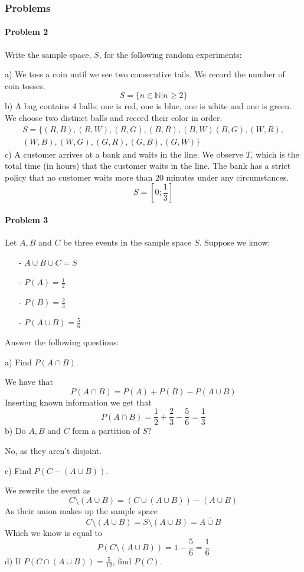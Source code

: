 \subsubsection{Problems}
\paragraph{Problem 2}
Write the sample space, $S$, for the following random experiments:

a) We toss a coin until we see two consecutive tails. We record the number of coin tosses.
\[
    S= \{n\in \mathbb{N}|n\geq 2\}
\]
b) A bag contains 4 balls: one is red, one is blue, one is white and one is green. We choose two distinct balls and record their color in order.
\begin{equation*}
    \begin{gathered}
        S=\{(R,B),(R,W),(R,G),(B,R),(B,W)(B,G),(W,R), \\
        (W,B),(W,G),(G,R),(G,B),(G,W)\}
    \end{gathered}
\end{equation*}
c) A customer arrives at a bank and waits in the line. We observe $T$, which is the total time (in hours) that the customer waits in the line. The bank has a strict policy that no customer waits more than 20 minutes under any circumstances.
\[
S=\left[0;\frac{1}{3}\right]
\]
\paragraph{Problem 3}
Let $A,B$ and $C$ be three events in the sample space $S$. Suppose we know:
\begin{itemize}
    \item[-] $A\cup B \cup C=S$
    \item[-] $P(A)=\frac{1}{2}$
    \item[-] $P(B)=\frac{2}{3}$
    \item[-] $P(A\cup B)=\frac{5}{6}$
\end{itemize}
Answer the following questions:

a) Find $P(A\cap B)$.

We have that
\[
    P(A\cap B)=P(A)+P(B)-P(A\cup B)
\]
Inserting known information we get that
\[
    P(A\cap B)=\frac{1}{2}+\frac{2}{3}-\frac{5}{6}=\frac{1}{3}
\]
b) Do $A,B$ and $C$ form a partition of $S$?

No, as they aren't disjoint.

c) Find $P(C-(A\cup B))$.

We rewrite the event as
\[
    C\setminus (A\cup B)=(C\cup (A\cup B))-(A\cup B)
\]
As their union makes up the sample space
\[
    C\setminus (A\cup B)=S\setminus (A\cup B)=\overline{A\cup B}
\]
Which we know is equal to
\[
    P(C\setminus (A\cup B))=1-\frac{5}{6}=\frac{1}{6}
\]
d) If $P(C\cap (A\cup B))=\frac{5}{12}$, find $P(C)$.

